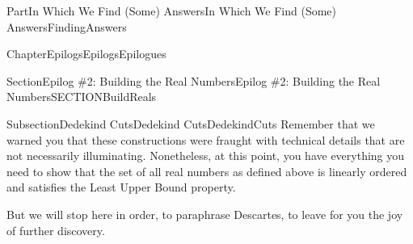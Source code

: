 \documentclass[oneside,10pt,]{book}
\numberwithin{equation}{part}
\providecommand\phantomsection{}
\begin{document}
\begin{partptx}{Part}{In Which We Find (Some) Answers}{}{In Which We Find (Some) Answers}{}{}{FindingAnswers}
\begin{chapterptx}{Chapter}{Epilogs}{}{Epilogs}{}{}{Epilogues}
\begin{sectionptx}{Section}{Epilog \#2: Building the Real Numbers}{}{Epilog \#2: Building the Real Numbers}{}{}{SECTIONBuildReals}
\begin{subsectionptx}{Subsection}{Dedekind Cuts}{}{Dedekind Cuts}{}{}{DedekindCuts}
Remember that we warned you that these constructions were fraught with technical details that are not necessarily illuminating.  Nonetheless, at this point, you have everything you need to show that the set of all real numbers as defined above is linearly ordered and satisfies the Least Upper Bound property.%
\par
But we will stop here in order, to paraphrase Descartes, to leave for you the joy of further discovery.%
\end{subsectionptx}
\end{sectionptx}
\end{chapterptx}
\end{partptx}
%
\backmatter%
%
\clearpage\phantomsection%
%
%
%
\typeout{************************************************}
\typeout{************************************************}
%
\end{document}
